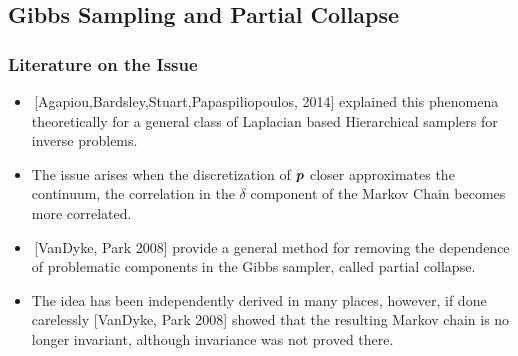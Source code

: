 \documentclass[]{beamer}
\newcommand{\bm}[1]{\mbox{\boldmath$#1$}}
\newcommand{\vect}[1]{\bm{#1}}
\begin{document}
\subsection{Gibbs Sampling and Partial Collapse}
\begin{frame}[t]
  \frametitle{Literature on the Issue}
  {\small
  \begin{itemize}
    \itemsep 1.2em
    \item \,[Agapiou,Bardsley,Stuart,Papaspiliopoulos, 2014] explained this phenomena theoretically for a general class of Laplacian based Hierarchical samplers for inverse problems.
    \item The issue arises when the discretization of \alert{$\vect p$} closer approximates the continuum, the correlation in the \alert{$\delta$} component of the Markov Chain becomes more correlated.
    \item \,[VanDyke, Park 2008] provide a general method for removing the dependence of problematic components in the Gibbs sampler, called \alert{partial collapse}.
    \item The idea has been independently derived in many places, however, if done carelessly [VanDyke, Park 2008] showed that the resulting Markov chain is no longer \alert{invariant}, although invariance was not proved there.
  \end{itemize}
  }
\end{frame}
\end{document}
